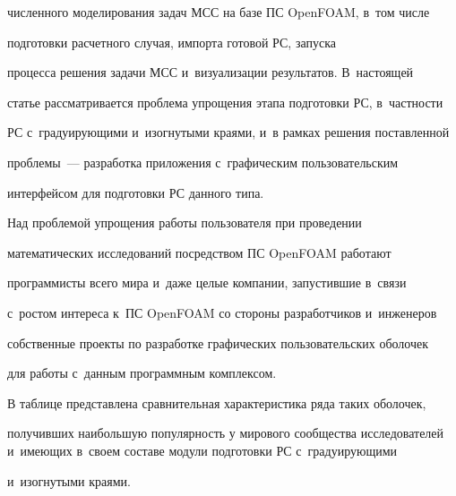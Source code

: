численного моделирования задач МСС на базе ПС OpenFOAM, в~том числе 


подготовки расчетного случая, импорта готовой РС, запуска 


процесса решения задачи МСС и~визуализации результатов. В~настоящей 


статье рассматривается проблема упрощения этапа подготовки РС, в~частности 


РС с~градуирующими и~изогнутыми краями, и~в рамках решения поставленной 


проблемы~--- разработка приложения с~графическим пользовательским 


интерфейсом для подготовки РС данного \mbox{типа.}


{





}


  


  Над проблемой упрощения работы пользователя при проведении 


математических исследований посредством ПС OpenFOAM работают 


программисты всего мира и~даже целые компании, запустившие в~связи 


с~ростом интереса к~ПС OpenFOAM со стороны разработчиков и~инженеров 


собственные проекты по разработке графических пользовательских оболочек 


для работы с~данным программным комплексом. 


  


  В таблице представлена сравнительная характеристика ряда таких оболочек, 


получивших наибольшую популярность у мирового сообщества исследователей и~имеющих в~своем составе модули подготовки РС с~градуирующими 


и~изогнутыми краями.


  


